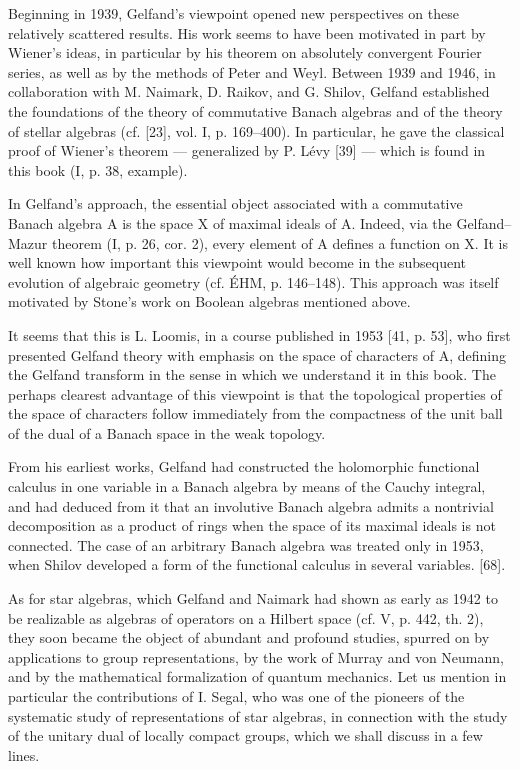 Beginning in 1939, Gelfand's viewpoint opened new perspectives on these relatively scattered results. His work seems to have been motivated in part by Wiener's ideas, in particular by his theorem on absolutely convergent Fourier series, as well as by the methods of Peter and Weyl. Between 1939 and 1946, in collaboration with M. Naimark, D. Raikov, and G. Shilov, Gelfand established the foundations of the theory of commutative Banach algebras and of the theory of stellar algebras (cf. {[}23{]}, vol. I, p. 169--400). In particular, he gave the classical proof of Wiener's theorem --- generalized by P. Lévy {[}39{]} --- which is found in this book (I, p. 38, example).

In Gelfand's approach, the essential object associated with a commutative Banach algebra A is the space X of maximal ideals of A. Indeed, via the Gelfand--Mazur theorem (I, p. 26, cor. 2), every element of A defines a function on X. It is well known how important this viewpoint would become in the subsequent evolution of algebraic geometry (cf. ÉHM, p. 146--148). This approach was itself motivated by Stone's work on Boolean algebras mentioned above.

It seems that this is L. Loomis, in a course published in 1953 {[}41, p. 53{]}, who first presented Gelfand theory with emphasis on the space of characters of A, defining the Gelfand transform in the sense in which we understand it in this book. The perhaps clearest advantage of this viewpoint is that the topological properties of the space of characters follow immediately from the compactness of the unit ball of the dual of a Banach space in the weak topology.

From his earliest works, Gelfand had constructed the holomorphic functional calculus in one variable in a Banach algebra by means of the Cauchy integral, and had deduced from it that an involutive Banach algebra admits a nontrivial decomposition as a product of rings when the space of its maximal ideals is not connected. The case of an arbitrary Banach algebra was treated only in 1953, when Shilov developed a form of the functional calculus in several variables. {[}68{]}.

As for star algebras, which Gelfand and Naimark had shown as early as 1942 to be realizable as algebras of operators on a Hilbert space (cf. V, p. 442, th. 2), they soon became the object of abundant and profound studies, spurred on by applications to group representations, by the work of Murray and von Neumann, and by the mathematical formalization of quantum mechanics. Let us mention in particular the contributions of I. Segal, who was one of the pioneers of the systematic study of representations of star algebras, in connection with the study of the unitary dual of locally compact groups, which we shall discuss in a few lines.

